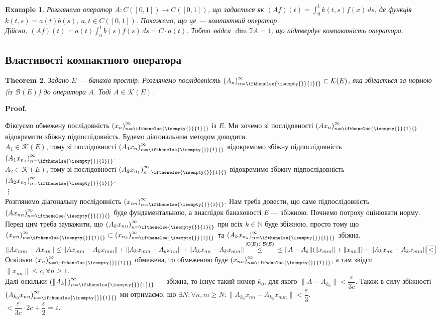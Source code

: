 \documentclass[a4paper, 10pt]{article}
\makeatletter
\theoremstyle{theoremdd}
\newtheorem{theorem}{Theorem}[subsection]
\theoremstyle{theoremdd}
\theoremstyle{theoremdd}
\theoremstyle{theoremdd}
\newtheorem{example}[theorem]{Example}
\theoremstyle{theoremdd}
\theoremstyle{theoremdd}
\theoremstyle{theoremdd}
\theoremstyle{theoremdd}
\newcommand{\sequence}[2][]{\left({#2}\right)_{n=\ifthenelse{\isempty{#1}}{1}{#1}}^{\infty}}
\renewenvironment{proof}[1][Proof.\\]{\par
\pushQED{\hfill \qed}%
\normalfont \topsep6\p@\@plus6\p@\relax
\trivlist
\item\relax
{\bfseries
#1\@addpunct{.}}\hspace\labelsep\ignorespaces
}{%
\popQED\endtrivlist\@endpefalse
}
\makeatother
\begin{document}
\begin{example}
Розглянемо оператор $A \colon C([0,1]) \to C([0,1])$, що задається як $(Af)(t) = \displaystyle\int_0^1 k(t,s) f(x)\,ds$, де функція $k(t,s) = a(t)b(s),\ a,t \in C([0,1])$. Покажемо, що це --- компактний оператор.\\
Дійсно, $(Af)(t) = a(t) \displaystyle\int_0^1 b(s)f(s)\,ds = C \cdot a(t)$. Тобто звідси $\dim \Im A = 1$, що підтвердує компактність оператора.
\end{example}

\subsection{Властивості компактного оператора}
\begin{theorem}
\label{convergence_to_compact}
Задано $E$ --- банахів простір. Розглянемо послідовність $\sequence{A_n} \subset \mathcal{K}(E)$, яка збігається за нормою (із $\mathcal{B}(E)$) до оператора $A$. Тоді $A \in \mathcal{K}(E)$.
\end{theorem}

\begin{proof}
Фіксуємо обмежену послідовність $\sequence{x_n}$ із $E$. Ми хочемо зі послідовності $\sequence{A x_n}$ відокремити збіжну підпослідовність. Будемо діагональним методом доводити.\\
$A_1 \in \mathcal{K}(E)$, тому зі послідовності $\sequence{A_1x_n}$ відокремимо збіжну підпослідовність $\sequence{A_1 x_{n_1}}$.\\
$A_2 \in \mathcal{K}(E)$, тому зі послідовності $\sequence{A_2x_{n_1}}$ відокремимо збіжну підпослідовність $\sequence{A_2 x_{n_2}}$.\\
\vdots \\
Розглянемо діагональну послідовність $\sequence{x_{nn}}$. Нам треба довести, що саме підпослідовність $\sequence{A x_{nn}}$ буде фундаментальною, а внаслідок банаховості $E$ --- збіжною. Почнемо потроху оцінювати норму.\\
Перед цим треба зауважити, що $\sequence{A_k x_{nn}}$ при всіх $k \in \mathbb{N}$ буде збіжною, просто тому що $\sequence{x_{nn}} \subset \sequence{x_{n_k}}$ та $\sequence{A_k x_{n_k}}$ збіжна.\\
$\| A x_{mm} - A x_{nn} \| \leq \|A x_{mm} - A_k x_{mm} \| + \| A_k x_{mm} - A_k x_{nn} \| + \|A_k x_{nn} - A_k x_{mm} \| \overset{\mathcal{K}(E) \subset \mathcal{B}(E)}{\leq} \\
\leq \|A - A_k\| (\|x_{mm}\| + \|x_{nn}\|) + \| A_k x_{nn} - A_k x_{mm} \| \boxed{<}$\\
Оскільки $\sequence{x_n}$ обмежена, то обмеженою буде $\sequence{x_{nn}}$, а там звідси $\|x_{nn}\| \leq c, \forall n \geq 1$.\\
Далі оскільки $\sequence{\|A_k\|}$ --- збіжна, то існує такий номер $k_0$, для якого $\|A - A_{k_0}\| < \dfrac{\varepsilon}{3c}$. Також в силу збіжності $\sequence{A_{k_0} x_{nn}}$ ми отримаємо, що $\exists N: \forall n,m \geq N: \|A_{k_0} x_{nn} - A_{k_0} x_{mm} \| < \dfrac{\varepsilon}{3}$.\\
$\boxed{<} \dfrac{\varepsilon}{3c} \cdot 2c + \dfrac{\varepsilon}{2} = \varepsilon$.
\end{proof}
\end{document}
